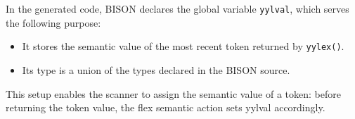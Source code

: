 In the generated code, BISON declares the global variable \texttt{yylval}, which serves the following purpose:
\begin{itemize}
    \item It stores the semantic value of the most recent token returned by \texttt{yylex()}.
    \item Its type is a union of the types declared in the BISON source.
\end{itemize}
This setup enables the scanner to assign the semantic value of a token: before returning the token value, the flex semantic action sets yylval accordingly.